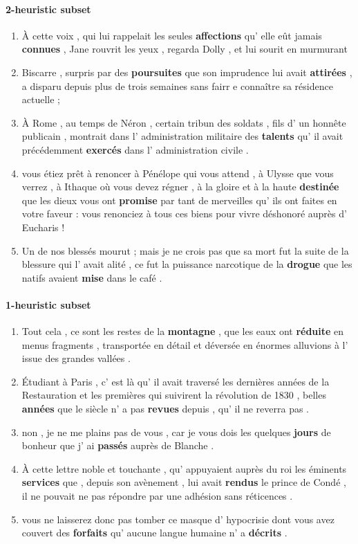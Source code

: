 \paragraph{2-heuristic subset}
\begin{enumerate}[itemsep=0pt,label=\arabic*).]
    \item À cette voix , qui lui rappelait les seules \textbf{affections} qu' elle eût jamais \textbf{connues} , Jane rouvrit les yeux , regarda Dolly , et lui sourit en murmurant
    \item Biscarre , surpris par des \textbf{poursuites} que son imprudence lui avait \textbf{attirées} , a disparu depuis plus de trois semaines sans fairr
e connaître sa résidence actuelle ;
    \item À Rome , au temps de Néron , certain tribun des soldats , fils d' un honnête publicain , montrait dans l' administration militaire des \textbf{talents} qu' il avait précédemment \textbf{exercés} dans l' administration civile .
    \item vous étiez prêt à renoncer à Pénélope qui vous attend , à Ulysse que vous verrez , à Ithaque où vous devez régner , à la gloire et à la haute \textbf{destinée} que les dieux vous ont \textbf{promise} par tant de merveilles qu' ils ont faites en votre faveur : vous renonciez à tous ces biens pour vivre déshonoré auprès d' Eucharis !
    \item Un de nos blessés mourut ; mais je ne crois pas que sa mort fut la suite de la blessure qui l' avait alité , ce fut la puissance narcotique de la \textbf{drogue} que les natifs avaient \textbf{mise} dans le café .
\end{enumerate}

\paragraph{1-heuristic subset}
\begin{enumerate}[itemsep=0pt,label=\arabic*).]
    \item Tout cela , ce sont les restes de la \textbf{montagne} , que les eaux ont \textbf{réduite} en menus fragments , transportée en détail et déversée en énormes alluvions à l' issue des grandes vallées .
    \item Étudiant à Paris , c' est là qu' il avait traversé les dernières années de la Restauration et les premières qui suivirent la révolution de 1830 , belles \textbf{années} que le siècle n' a pas \textbf{revues} depuis , qu' il ne reverra pas .
    \item non , je ne me plains pas de vous , car je vous dois les quelques \textbf{jours} de bonheur que j' ai \textbf{passés} auprès de Blanche .
    \item À cette lettre noble et touchante , qu' appuyaient auprès du roi les éminents \textbf{services} que , depuis son avènement , lui avait \textbf{rendus} le prince de Condé , il ne pouvait ne pas répondre par une adhésion sans réticences .
    \item vous ne laisserez donc pas tomber ce masque d' hypocrisie dont vous avez couvert des \textbf{forfaits} qu' aucune langue humaine n' a \textbf{décrits} .
\end{enumerate}


